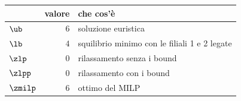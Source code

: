 \begin{center}\small
\begin{tabular}{lrl}
\toprule
 & valore & che cos'è \\
\midrule
$\ub$ & $6$ & soluzione euristica \\
$\lb$ & $4$ & squilibrio minimo con le filiali 1 e 2 legate \\
$\zlp$ & $0$ & rilassamento senza i bound \\
$\zlpp$ & $0$ & rilassamento con i bound \\
$\zmilp$ & $6$ & ottimo del MILP \\
\bottomrule
\end{tabular}
\end{center}

